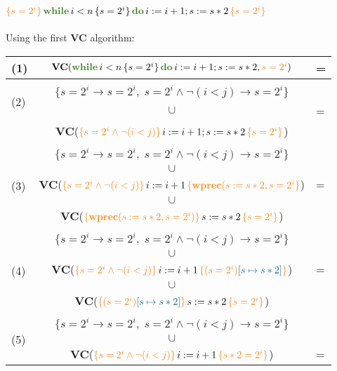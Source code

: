 \documentclass[11pt]{article}
\newcommand{\kw}[1]{{\color{OliveGreen}{#1}}}
\newcommand{\horange}[1]{{\color{BurntOrange}{#1}}}
\newcommand{\hblue}[1]{{\color{MidnightBlue}{#1}}}
\newcommand{\hoaret}[3]{{\color{BurntOrange}{\{#1\}}}\,#2\,{\color{BurntOrange}{\{#3\}}}}
\begin{document}
\newpage
{} $\hoaret{s = 2^i}{\textbf{\kw{while}}\,i<n\,\{s = 2^i\}\,\textbf{\kw{do}}\,i := i +1 ;s := s*2}{s = 2^i}$\\\vspace{0.1cm}\\
Using the first \textbf{VC} algorithm:\\

\begin{tabular}{lcl}
  (1) & $\textbf{VC}(\textbf{\kw{while}}\,i<n\,\{s = 2^i\}\,\textbf{\kw{do}}\,i := i +1 ;s := s*2,\horange{s = 2^i})$ & =\\[2ex]\hline\\
  \multirow{2}{*}{(2)} & $\{s = 2^i \to s = 2^i,\;s = 2^i \land \neg(i <j) \to s = 2^i\}$ \\
  & \multicolumn{1}{c}{$\cup$} & =\\
  & \textbf{VC}($\hoaret{s = 2^i \land \neg(i < j)}{i := i +1 ;s := s*2}{s = 2^i}$) \\[2ex]\hline\\
  \multirow{5}{*}{(3)} & $\{s = 2^i \to s = 2^i,\;s = 2^i \land \neg(i <j) \to s = 2^i\}$ \\
  & \multicolumn{1}{c}{$\cup$} \\
  & \textbf{VC}($\hoaret{s = 2^i \land \neg(i < j)}{i := i+1}{\textbf{wprec}(s := s*2,s = 2^i}$) & =\\
  & \multicolumn{1}{c}{$\cup$} \\
  & \textbf{VC}($\hoaret{\textbf{wprec}(s := s*2,s = 2^i)}{s := s*2}{s = 2^i}$) \\[2ex]\hline\\  
  \multirow{5}{*}{(4)} & $\{s = 2^i \to s = 2^i,\;s = 2^i \land \neg(i <j) \to s = 2^i\}$ \\
  & \multicolumn{1}{c}{$\cup$} \\
  & \textbf{VC}($\hoaret{s = 2^i \land \neg(i < j)}{i := i+1}{(s = 2^i)\hblue{[s \mapsto s*2]}}$) & =\\
  & \multicolumn{1}{c}{$\cup$} \\
  & \textbf{VC}($\hoaret{(s = 2^i)\hblue{[s \mapsto s*2]}}{s := s*2}{s = 2^i}$)\\[2ex]\hline\\  
  \multirow{5}{*}{(5)} & $\{s = 2^i \to s = 2^i,\;s = 2^i \land \neg(i <j) \to s = 2^i\}$ \\
  & \multicolumn{1}{c}{$\cup$} \\
  & \textbf{VC}($\hoaret{s = 2^i \land \neg(i < j)}{i := i+1}{s*2 = 2^i}$) & =\\

\end{tabular}
\end{document}
